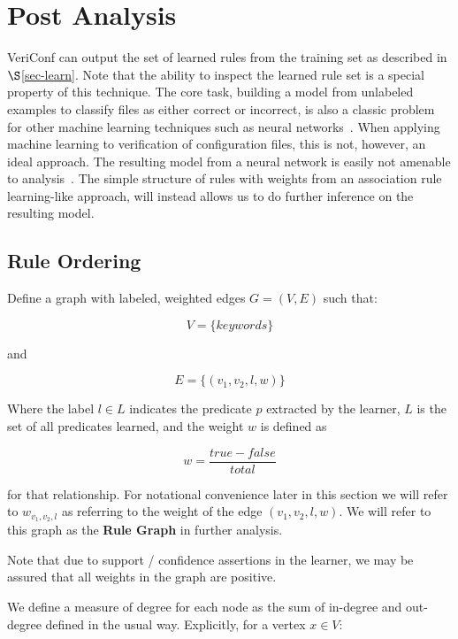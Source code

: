 
\section{Post Analysis}

VeriConf can output the set of learned rules from the training set as described in $\S$\ref{sec-learn}.
Note that the ability to inspect the learned rule set is a special property of this technique.
The core task, building a model from unlabeled examples to classify files as either correct or incorrect, is also a classic problem for other machine learning techniques such as neural networks~\cite{nn1,nn2,nn3}.
When applying machine learning to verification of configuration files, this is not, however, an ideal approach.
The resulting model from a neural network is easily not amenable to analysis~\cite{nnAnalysis1,nnAnalysis2}.
The simple structure of rules with weights from an association rule learning-like approach, will instead allows us to do further inference on the resulting model.

\subsection{Rule Ordering}
\label{sec:ruleorder}

Define a graph with labeled, weighted edges $G = (V,E)$ such that:

    $$V = \{ keywords \}$$

and 

    $$E = \{ (v_1, v_2, l, w) \}$$

Where the label $l \in L$ indicates the predicate $p$ extracted by the learner,
$L$ is the set of all predicates learned,
and the weight $w$ is defined as 

    $$w = \frac{true - false}{total}$$

for that relationship. For notational convenience later in this section
we will refer to $w_{v_1, v_2, l}$ as referring to the weight of the
edge $(v_1, v_2, l, w)$. We will refer to this graph as the {\bf Rule Graph}
in further analysis.

Note that due to support / confidence assertions in the learner, we
may be assured that all weights in the graph are positive.

We define a measure of degree for each node as the sum of in-degree
and out-degree defined in the usual way. Explicitly, for a vertex $x \in V$:

